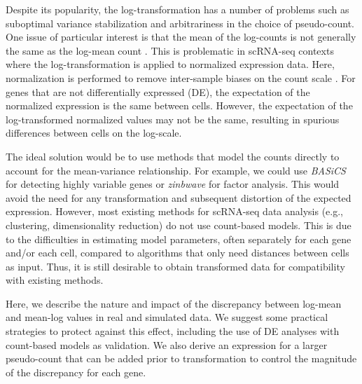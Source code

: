 \documentclass[10pt,letterpaper]{article}
\begin{document}
Despite its popularity, the log-transformation has a number of problems such as suboptimal variance stabilization and arbitrariness in the choice of pseudo-count.
One issue of particular interest is that the mean of the log-counts is not generally the same as the log-mean count \cite{hicks2017missing}.
This is problematic in scRNA-seq contexts where the log-transformation is applied to normalized expression data.
Here, normalization is performed to remove inter-sample biases on the count scale \cite{robinson2010scaling,lun2016pooling}.
For genes that are not differentially expressed (DE), the expectation of the normalized expression is the same between cells.
However, the expectation of the log-transformed normalized values may not be the same, resulting in spurious differences between cells on the log-scale.

The ideal solution would be to use methods that model the counts directly to account for the mean-variance relationship.
For example, we could use \textit{BASiCS} \cite{vallejos2016beyond} for detecting highly variable genes or \textit{zinbwave} \cite{risso2018general} for factor analysis.
This would avoid the need for any transformation and subsequent distortion of the expected expression.
However, most existing methods for scRNA-seq data analysis (e.g., clustering, dimensionality reduction) do not use count-based models.
This is due to the difficulties in estimating model parameters, often separately for each gene and/or each cell,
compared to algorithms that only need distances between cells as input.
Thus, it is still desirable to obtain transformed data for compatibility with existing methods.

Here, we describe the nature and impact of the discrepancy between log-mean and mean-log values in real and simulated data.
We suggest some practical strategies to protect against this effect, including the use of DE analyses with count-based models as validation.
We also derive an expression for a larger pseudo-count that can be added prior to transformation to control the magnitude of the discrepancy for each gene.
\end{document}
